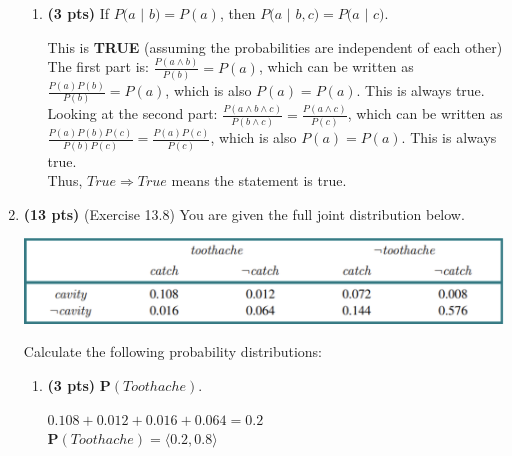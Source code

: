 \documentclass{article}
\begin{document}
\begin{enumerate}
\begin{enumerate}[label=($\alph*$)]
    \item \textbf{(3 pts)} If $P(a$ $|$ $b) = P(a)$, then $P(a$ $|$ $b,c) = P(a$ $|$ $c)$.

    \color{blue}
        This is \textbf{TRUE} (assuming the probabilities are independent of each other)\\
        The first part is: $\frac{P(a \wedge b)}{P(b)} = P(a)$, which can be written as $\frac{P(a)P(b)}{P(b)} = P(a)$, which is also $P(a) = P(a)$. This is always true.\\
        Looking at the second part: $\frac{P(a \wedge b \wedge c)}{P(b \wedge c)} = \frac{P(a \wedge c)}{P(c)}$, which can be written as $\frac{P(a)P(b)P(c)}{P(b)P(c)} = \frac{P(a)P(c)}{P(c)}$, which is also $P(a) = P(a)$. This is always true.\\
        Thus, $True \Rightarrow True$ means the statement is true.
    \color{black}

    
    \end{enumerate}



\item \textbf{(13 pts)} (Exercise 13.8) You are given the full joint distribution below.

\begin{center}
    \includegraphics[scale=0.6]{472-PS8-Q4.png}
\end{center}

Calculate the following probability distributions:

    \begin{enumerate}[label=($\alph*$)]


    \item \textbf{(3 pts)} $\mathbf{P}(Toothache)$.

    \color{blue}
        $0.108 + 0.012 + 0.016 + 0.064 = 0.2$\\
        $\mathbf{P}(Toothache) = \langle 0.2, 0.8 \rangle$
    \color{black}


\end{enumerate}
\end{enumerate}
\end{document}
